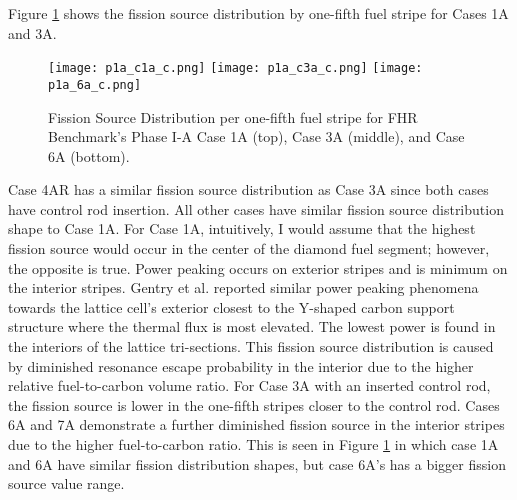 Figure \ref{fig:phase1a-c} shows the fission source distribution by 
one-fifth fuel stripe for Cases 1A and 3A. 
\begin{figure}[]
    \centering
    \texttt{[image: p1a\_c1a\_c.png]} 
    \texttt{[image: p1a\_c3a\_c.png]} 
    \texttt{[image: p1a\_6a\_c.png]} 
    \caption{Fission Source Distribution per one-fifth fuel stripe for 
    \acrlong{FHR} Benchmark's Phase I-A Case 1A (top), Case 3A (middle), 
    and Case 6A (bottom).}
    \label{fig:phase1a-c}
\end{figure}
Case 4AR has a similar fission source distribution as Case 3A since both 
cases have control rod insertion. 
All other cases have similar fission source distribution shape to Case 1A. 
For Case 1A, intuitively, I would assume that the highest fission source would 
occur in the center of the diamond fuel segment; however, the opposite is true. 
Power peaking occurs on exterior stripes and is minimum on the interior stripes.
Gentry et al. \cite{gentry_development_2016} reported similar power peaking 
phenomena towards the lattice cell's exterior closest to the Y-shaped carbon 
support structure where the thermal flux is most elevated. 
The lowest power is found in the interiors of the lattice tri-sections. 
This fission source distribution is caused by diminished resonance escape 
probability in the interior due to the higher relative fuel-to-carbon volume 
ratio. 
For Case 3A with an inserted control rod, the fission source is lower in 
the one-fifth stripes closer to the control rod.  
Cases 6A and 7A demonstrate a further diminished fission source in the interior 
stripes due to the higher fuel-to-carbon ratio.
This is seen in Figure \ref{fig:phase1a-c} in which case 1A and 6A have similar 
fission distribution shapes, but case 6A's has a bigger fission source value range. 


